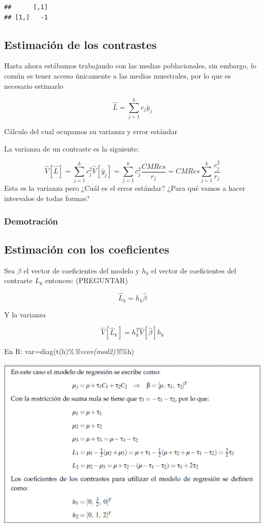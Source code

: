 \documentclass[
]{article}
\begin{document}
\begin{verbatim}
##      [,1]
## [1,]   -1
\end{verbatim}

\subsection{Estimación de los
contrastes}\label{estimaciuxf3n-de-los-contrastes}

Hasta ahora estábamos trabajando con las medias poblacionales, sin
embargo, lo común es tener acceso únicamente a las medias muestrales,
por lo que es necesario estimarlo

\[
\hat L=\sum^k_{j=1}c_j\bar y_j 
\]

Cálculo del cual ocupamos su varianza y error estándar

La varianza de un contraste es la siguiente;

\[
\hat V [\hat L] = \sum^k_{j=1}c^2_j\hat V[\bar y _j]=\sum^k_{j=1}c^2_j\frac{CMRes}{r_j}=CMRes\sum^k_{j=1}\frac{c_j^2}{r_j}
\] Esta es la varianza pero ¿Cuál es el error estándar? ¿Para qué vamos
a hacer inteevalos de todas formas?

\subsubsection{Demotración}\label{demotraciuxf3n}

\subsection{Estimación con los
coeficientes}\label{estimaciuxf3n-con-los-coeficientes}

Sea \(\beta\) el vector de coeficientes del modelo y \(h_k\) el vector
de coeficientes del contraste \(L_k\) entonces: (PREGUNTAR)

\[\hat L_k = h_k\hat \beta\]

Y la varianza

\[
\hat V[\hat L_k]=h_k^T\hat V[\hat \beta]h_k
\]

En R: var=diag(t(h)\%\emph{\%vcov(mod2)\%}\%h)

\includegraphics[width=9.08in]{../Fotos resumenes/1}
\end{document}
